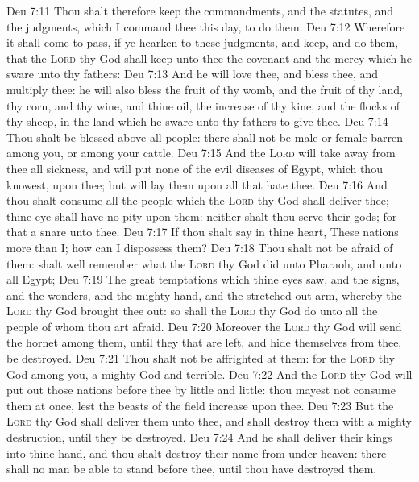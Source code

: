 \vs Deu 7:11 Thou shalt therefore keep the commandments, and the statutes, and the judgments, which I command thee this day, to do them.
\vs Deu 7:12 Wherefore it shall come to pass, if ye hearken to these judgments, and keep, and do them, that the \textsc{Lord} thy God shall keep unto thee the covenant and the mercy which he sware unto thy fathers:
\vs Deu 7:13 And he will love thee, and bless thee, and multiply thee: he will also bless the fruit of thy womb, and the fruit of thy land, thy corn, and thy wine, and thine oil, the increase of thy kine, and the flocks of thy sheep, in the land which he sware unto thy fathers to give thee.
\vs Deu 7:14 Thou shalt be blessed above all people: there shall not be male or female barren among you, or among your cattle.
\vs Deu 7:15 And the \textsc{Lord} will take away from thee all sickness, and will put none of the evil diseases of Egypt, which thou knowest, upon thee; but will lay them upon all  that hate thee.
\vs Deu 7:16 And thou shalt consume all the people which the \textsc{Lord} thy God shall deliver thee; thine eye shall have no pity upon them: neither shalt thou serve their gods; for that  a snare unto thee.
\vs Deu 7:17 If thou shalt say in thine heart, These nations  more than I; how can I dispossess them?
\vs Deu 7:18 Thou shalt not be afraid of them:  shalt well remember what the \textsc{Lord} thy God did unto Pharaoh, and unto all Egypt;
\vs Deu 7:19 The great temptations which thine eyes saw, and the signs, and the wonders, and the mighty hand, and the stretched out arm, whereby the \textsc{Lord} thy God brought thee out: so shall the \textsc{Lord} thy God do unto all the people of whom thou art afraid.
\vs Deu 7:20 Moreover the \textsc{Lord} thy God will send the hornet among them, until they that are left, and hide themselves from thee, be destroyed.
\vs Deu 7:21 Thou shalt not be affrighted at them: for the \textsc{Lord} thy God  among you, a mighty God and terrible.
\vs Deu 7:22 And the \textsc{Lord} thy God will put out those nations before thee by little and little: thou mayest not consume them at once, lest the beasts of the field increase upon thee.
\vs Deu 7:23 But the \textsc{Lord} thy God shall deliver them unto thee, and shall destroy them with a mighty destruction, until they be destroyed.
\vs Deu 7:24 And he shall deliver their kings into thine hand, and thou shalt destroy their name from under heaven: there shall no man be able to stand before thee, until thou have destroyed them.
